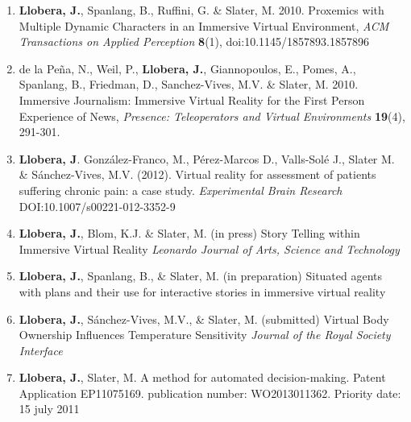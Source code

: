 \documentclass[
		twoside,openright,titlepage,numbers=noenddot,manychapters,
		headinclude,%
                footinclude=false,cleardoublepage=empty,
                BCOR=5mm,
		fontsize=11pt, %
                 enabledeprecatedfontcommands]{scrreprt}
\begin{document}
\begin{titlepage}
\begin{addmargin}[0cm]{0cm}
\begin{small}
\begin{flushright}
\begin{minipage}{1.0\textwidth}
\begin{enumerate}
\item {\bf Llobera, J.}, Spanlang, B., Ruffini, G. \& Slater, M. 2010. Proxemics with Multiple Dynamic Characters in an Immersive Virtual Environment, \emph{ACM Transactions on Applied Perception} {\bf 8}(1),  doi:10.1145/1857893.1857896
\item de la Peña, N., Weil, P., {\bf Llobera, J.}, Giannopoulos, E., Pomes, A., Spanlang, B., Friedman, D., Sanchez-Vives, M.V. \& Slater, M. 2010. Immersive Journalism: Immersive Virtual Reality for the First Person Experience of News, \emph{Presence: Teleoperators and Virtual Environments}  {\bf 19}(4),  291-301.
\item {\bf Llobera, J}. González-Franco, M., Pérez-Marcos D., Valls-Solé J., Slater M. \& Sánchez-Vives, M.V. (2012). Virtual reality for assessment of patients suffering chronic pain: a case study. \emph{Experimental Brain Research} DOI:10.1007/s00221-012-3352-9
\item {\bf Llobera, J.}, Blom, K.J. \& Slater, M. (in press) Story Telling within Immersive Virtual Reality \emph{Leonardo Journal of Arts, Science and Technology}
\item  {\bf Llobera, J.}, Spanlang, B., \& Slater, M. (in preparation) Situated agents with plans and their use for interactive stories in immersive virtual reality
\item  {\bf Llobera, J.}, Sánchez-Vives, M.V., \& Slater, M. (submitted) Virtual Body Ownership Influences Temperature Sensitivity \emph{Journal of the Royal Society Interface}
\ \\
\item {\bf Llobera, J.}, Slater, M. A method for automated decision-making. Patent Application EP11075169. publication number: WO2013011362. Priority date: 15 july 2011 

\end{enumerate} 

\end{minipage}
\end{flushright}

\vfill



\end{small}
\end{addmargin}
\end{titlepage}
\end{document}
